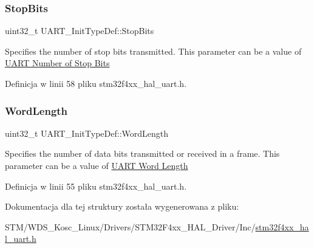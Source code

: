 \mbox{\label{struct_u_a_r_t___init_type_def_a6717dfe595617c7b2d57139d9cd306ef}} 
\subsubsection{\texorpdfstring{Stop\+Bits}{StopBits}}
{\footnotesize\ttfamily uint32\+\_\+t U\+A\+R\+T\+\_\+\+Init\+Type\+Def\+::\+Stop\+Bits}

Specifies the number of stop bits transmitted. This parameter can be a value of \hyperlink{group___u_a_r_t___stop___bits}{U\+A\+RT Number of Stop Bits} 

Definicja w linii 58 pliku stm32f4xx\+\_\+hal\+\_\+uart.\+h.

\mbox{\label{struct_u_a_r_t___init_type_def_a0f1cd85e62aa4fd4b36ee9e610e7789f}} 
\subsubsection{\texorpdfstring{Word\+Length}{WordLength}}
{\footnotesize\ttfamily uint32\+\_\+t U\+A\+R\+T\+\_\+\+Init\+Type\+Def\+::\+Word\+Length}

Specifies the number of data bits transmitted or received in a frame. This parameter can be a value of \hyperlink{group___u_a_r_t___word___length}{U\+A\+RT Word Length} 

Definicja w linii 55 pliku stm32f4xx\+\_\+hal\+\_\+uart.\+h.



Dokumentacja dla tej struktury została wygenerowana z pliku\+:\begin{DoxyCompactItemize}
\item 
S\+T\+M/\+W\+D\+S\+\_\+\+Kosc\+\_\+\+Linux/\+Drivers/\+S\+T\+M32\+F4xx\+\_\+\+H\+A\+L\+\_\+\+Driver/\+Inc/\hyperlink{stm32f4xx__hal__uart_8h}{stm32f4xx\+\_\+hal\+\_\+uart.\+h}\end{DoxyCompactItemize}
